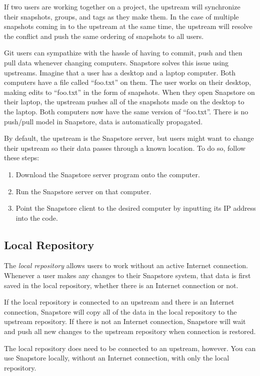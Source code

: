 If two users are working together on a project, the upstream will synchronize their snapshots, groups, and tags as they make them. In the case of multiple snapshots coming in to the upstream at the same time, the upstream will resolve the conflict and push the same ordering of snapshots to all users.

Git users can sympathize with the hassle of having to commit, push and then pull data whenever changing computers. Snapstore solves this issue using upstreams. Imagine that a user has a desktop and a laptop computer. Both computers have a file called ``foo.txt'' on them. The user works on their desktop, making edits to ``foo.txt'' in the form of snapshots. When they open Snapstore on their laptop, the upstream pushes all of the snapshots made on the desktop to the laptop. Both computers now have the same version of ``foo.txt''. There is no push/pull model in Snapstore, data is automatically propagated.

By default, the upstream is the Snapstore server, but users might want to change their upstream so their data passes through a known location. To do so, follow these steps:
\begin{enumerate}
  \item{Download the Snapstore server program onto the computer.}
  \item{Run the Snapstore server on that computer.}
  \item{Point the Snapstore client to the desired computer by inputting its IP address into the code.}
\end{enumerate}

\subsection{Local Repository}

The \textit{local repository} allows users to work without an active Internet connection. Whenever a user makes any changes to their Snapstore system, that data is first saved in the local repository, whether there is an Internet connection or not. 

If the local repository is connected to an upstream and there is an Internet connection, Snapstore will copy all of the data in the local repository to the upstream repository. If there is not an Internet connection, Snapstore will wait and push all new changes to the upstream repository when connection is restored.

The local repository does need to be connected to an upstream, however. You can use Snapstore locally, without an Internet connection, with only the local repository.

